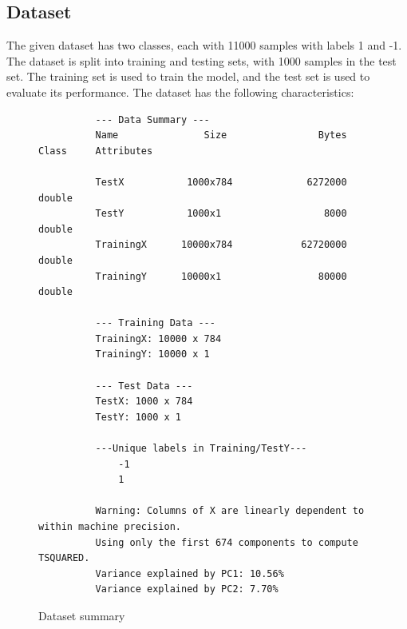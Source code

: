\documentclass{article}
\begin{document}
\subsection*{Dataset}
The given dataset has two classes, each with 11000 samples with labels 1 and -1. The dataset is split into training and testing sets, with 1000 samples in the test set. The training set is used to train the model, and the test set is used to evaluate its performance. The dataset has the following characteristics:

\begin{figure}
\centering  
\begin{verbatim}
          --- Data Summary ---
          Name               Size                Bytes  Class     Attributes

          TestX           1000x784             6272000  double              
          TestY           1000x1                  8000  double              
          TrainingX      10000x784            62720000  double              
          TrainingY      10000x1                 80000  double              

          --- Training Data ---
          TrainingX: 10000 x 784
          TrainingY: 10000 x 1

          --- Test Data ---
          TestX: 1000 x 784
          TestY: 1000 x 1

          ---Unique labels in Training/TestY---
              -1
              1

          Warning: Columns of X are linearly dependent to within machine precision.
          Using only the first 674 components to compute TSQUARED. 
          Variance explained by PC1: 10.56%
          Variance explained by PC2: 7.70%
\end{verbatim}
  \caption{Dataset summary}
  \label{fig:dataset_summary}
\end{figure}
\end{document}
